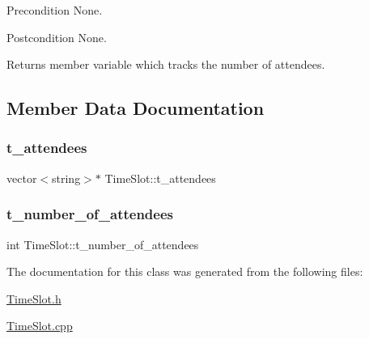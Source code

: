 \begin{DoxyPrecond}{Precondition}
None. 
\end{DoxyPrecond}
\begin{DoxyPostcond}{Postcondition}
None. 
\end{DoxyPostcond}
\begin{DoxyReturn}{Returns}
member variable which tracks the number of attendees. 
\end{DoxyReturn}


\subsection{Member Data Documentation}
\mbox{\label{class_time_slot_af74c9a337132bdf41a884afa672f5fb2}} 
\subsubsection{\texorpdfstring{t\+\_\+attendees}{t\_attendees}}
{\footnotesize\ttfamily vector$<$string$>$$\ast$ Time\+Slot\+::t\+\_\+attendees\hspace{0.3cm}{\ttfamily [private]}}

\mbox{\label{class_time_slot_a601a4893958c7880308093482ab4ccf8}} 
\subsubsection{\texorpdfstring{t\+\_\+number\+\_\+of\+\_\+attendees}{t\_number\_of\_attendees}}
{\footnotesize\ttfamily int Time\+Slot\+::t\+\_\+number\+\_\+of\+\_\+attendees\hspace{0.3cm}{\ttfamily [private]}}



The documentation for this class was generated from the following files\+:\begin{DoxyCompactItemize}
\item 
\hyperlink{_time_slot_8h}{Time\+Slot.\+h}\item 
\hyperlink{_time_slot_8cpp}{Time\+Slot.\+cpp}\end{DoxyCompactItemize}
